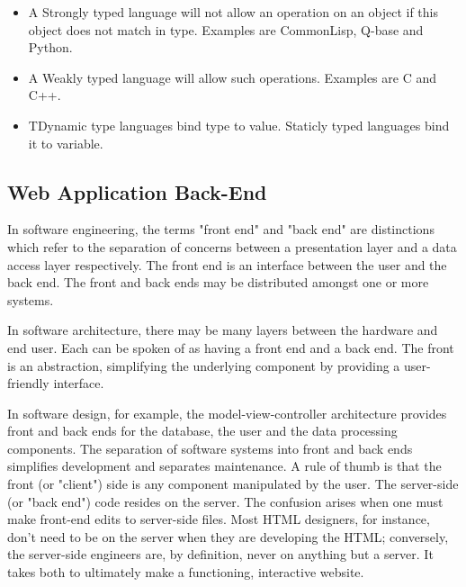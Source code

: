 \begin{itemize}
  \item A Strongly typed language will not allow an operation on an object if this object does not match in type. Examples are CommonLisp, Q-base and Python.
  \item A Weakly typed language will allow such operations. Examples are C and C++.
  \item TDynamic type languages bind type to value. Staticly typed languages bind it to variable.
\end{itemize}

\subsection{Web Application Back-End}
In software engineering, the terms "front end" and "back end" are distinctions which refer to the separation of concerns between a presentation layer and a data access layer respectively.
The front end is an interface between the user and the back end. The front and back ends may be distributed amongst one or more systems.

In software architecture, there may be many layers between the hardware and end user. Each can be spoken of as having a front end and a back end. The front is an abstraction, simplifying the underlying component by providing a user-friendly interface.

In software design, for example, the model-view-controller architecture provides front and back ends for the database, the user and the data processing components. The separation of software systems into front and back ends simplifies development and separates maintenance. A rule of thumb is that the front (or "client") side is any component manipulated by the user. The server-side (or "back end") code resides on the server. The confusion arises when one must make front-end edits to server-side files. Most HTML designers, for instance, don't need to be on the server when they are developing the HTML; conversely, the server-side engineers are, by definition, never on anything but a server. It takes both to ultimately make a functioning, interactive website.
